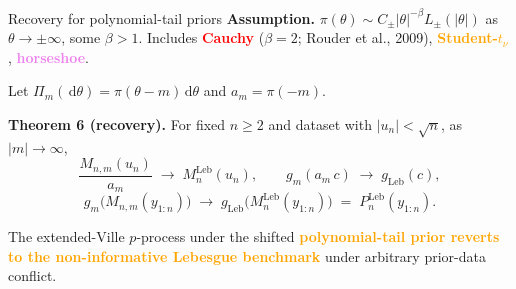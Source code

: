 \documentclass[final]{beamer}
\newcommand{\dd}{\,\mathrm{d}}
\newcommand{\Leb}{\mathrm{Leb}}
\newcommand{\Lap}{\mathrm{Lap}}
\newlength{\colwidth}
\begin{document}
\begin{frame}[t]
\begin{columns}[t]
\begin{column}{\colwidth}




  \begin{alertblock}{Recovery for polynomial-tail priors}
    \textbf{Assumption.} $\pi(\theta)\sim C_\pm |\theta|^{-\beta}L_\pm(|\theta|)$ as $\theta\to\pm\infty$, some $\beta>1$. Includes \textcolor{red}{\textbf{Cauchy}} ($\beta=2$; Rouder et al., 2009), \textcolor{orange}{\textbf{Student-$t_\nu$}}, \textcolor{violet}{\textbf{horseshoe}}.

    Let $\Pi_m(\dd\theta)=\pi(\theta-m)\dd\theta$ and $a_m=\pi(-m)$.

    \vspace{0.15cm}
    \textbf{Theorem 6 (recovery).} For fixed $n\ge 2$ and dataset with $|u_n|<\sqrt n$, as $|m|\to\infty$,
    \[
      \frac{M_{n,m}(u_n)}{a_m}\;\to\;M_n^{\Leb}(u_n),\qquad
      g_m(a_m\,c)\;\to\;g_{\Leb}(c),
    \]
    \[
      g_m\!\bigl(M_{n,m}(y_{1:n})\bigr)\;\longrightarrow\;g_{\Leb}\!\bigl(M_n^{\Leb}(y_{1:n})\bigr)\;=\;P_n^{\Leb}(y_{1:n}).
    \]

    \vspace{0.1cm}
    The extended-Ville $p$-process under the shifted \textcolor{orange}{\textbf{polynomial-tail prior reverts to the non-informative Lebesgue benchmark}} under arbitrary prior-data conflict. %


\end{alertblock}
\end{column}
\end{columns}
\end{frame}
\end{document}
